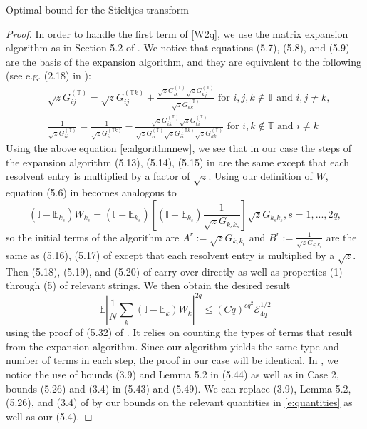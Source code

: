 \documentclass[11pt, a4paper, oneside]{book}
\numberwithin{equation}{chapter}
\newcommand{\E}{\mathbb E}
\newcommand{\T}{\mathbb{T}}
\newcommand{\beq}{\begin{equation}}
\newcommand{\eeq}{\end{equation}}
\begin{document}
\begin{section}{Optimal bound for the Stieltjes transform}
\begin{proof}
In order to handle the first term of \eqref{W2q}, we use the matrix expansion algorithm as in Section 5.2 of \cite{cacciapuoti2015bounds}. We notice that equations (5.7), (5.8), and (5.9) are the basis of the expansion algorithm, and they are equivalent to the following (see e.g. (2.18) in \cite{pillai2014universality}):
\beq \label{e:algorithmnew}\begin{split}
&\sqrt z G_{ij}^{(\T)} = \sqrt z G_{ij}^{(\T k)} + \frac{\sqrt z G_{ik}^{(\T)}\sqrt z G_{kj}^{(\T)}}{\sqrt z G_{kk}^{(\T)}} \text{ for } i, j, k \notin \T \text{ and } i,j \neq k,
\\
&\frac{1}{\sqrt z G_{ii}^{(\T)}} = \frac{1}{\sqrt z G_{ii}^{(\T k)}} - \frac{\sqrt z G_{ik}^{(\T)}\sqrt z G_{ki}^{(\T)}}{\sqrt z G_{ii}^{(\T)}\sqrt z G_{ii}^{(\T k)}\sqrt z G_{kk}^{(\T)}} \text{ for } i, k \notin \T \text{ and } i \neq k
\end{split}
\eeq
Using the above equation \eqref{e:algorithmnew}, we see that in our case the steps of the expansion algorithm (5.13), (5.14), (5.15) in \cite{cacciapuoti2015bounds} are the same except that each resolvent entry is multiplied by a factor of $\sqrt z$. Using our definition of $W$, equation (5.6) in \cite{cacciapuoti2015bounds} becomes analogous to
\begin{equation} \label{formexpand}
( \mathbb{I}-\E_{k_s})W_{k_s} = ( \mathbb{I}-\E_{k_s}) \left [ ( \mathbb{I}-\E_{k_s}) \frac{1}{\sqrt{z}G_{k_s k_s}} \right ] \sqrt{z} G_{k_s k_s} , s=1,...,2q ,
\end{equation}
so the initial terms of the algorithm are $A^{r}:=\sqrt z G_{k_r k_r}$ and $B^{r} :=\frac{1}{\sqrt{z}G_{k_r k_r}}$ are the same as (5.16), (5.17) of \cite{cacciapuoti2015bounds} except that each resolvent entry is multiplied by a $\sqrt z$.
Then (5.18), (5.19), and (5.20) of \cite{cacciapuoti2015bounds} carry over directly as well as properties (1) through (5) of relevant strings. We then obtain the desired result
\[
\E \left|\frac{1}{N}\sum_k( \mathbb{I}-\E_{k})W_{k}\right|^{2q} \leq (Cq)^{cq^2} \mathcal{E}_{4q}^{1/2}
\]
using the proof of (5.32) of \cite{cacciapuoti2015bounds}. It relies on counting the types of terms that result from the expansion algorithm. Since our algorithm yields the same type and number of terms in each step, the proof in our case will be identical.
In \cite{cacciapuoti2015bounds}, we notice the use of bounds (3.9) and Lemma 5.2 in (5.44) as well as in Case 2, bounds (5.26) and (3.4) in (5.43) and (5.49). We can replace (3.9), Lemma 5.2, (5.26), and (3.4) of \cite{cacciapuoti2015bounds} by our bounds on the relevant quantities in \eqref{e:quantities} as well as our (5.4).

\end{proof}
\end{section}
\end{document}
